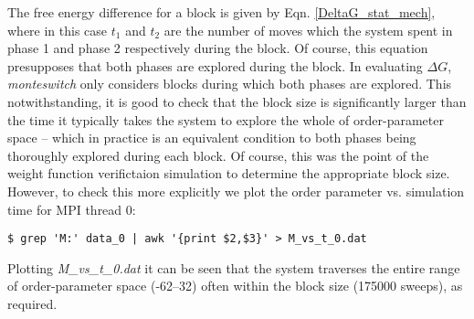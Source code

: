 \documentclass{report}
\begin{document}
The free energy difference for a block is given by Eqn. \eqref{DeltaG_stat_mech}, where in this case $t_1$ and $t_2$ are the number of moves which the 
system spent in phase 1 and phase 2 respectively during the block. Of course, this equation presupposes that both phases are explored during the block. 
In evaluating $\Delta G$, \emph{monteswitch} only considers blocks during which both phases are explored. This notwithstanding, it is good to check that
the block size is significantly larger than the time it typically takes the system to explore the whole of order-parameter space -- which in practice
is an equivalent condition to both phases being thoroughly explored during each block. Of course, this was the point of the weight function verifictaion
simulation to determine the appropriate block size. However, to check this more explicitly we plot the order parameter vs. simulation time for MPI thread 0:
\begin{verbatim}
$ grep 'M:' data_0 | awk '{print $2,$3}' > M_vs_t_0.dat
\end{verbatim}
Plotting \emph{M\_vs\_t\_0.dat} it can be seen that the system traverses the entire range of order-parameter space (-62--32) often within the block size 
(175000 sweeps), as required.







\end{document}
